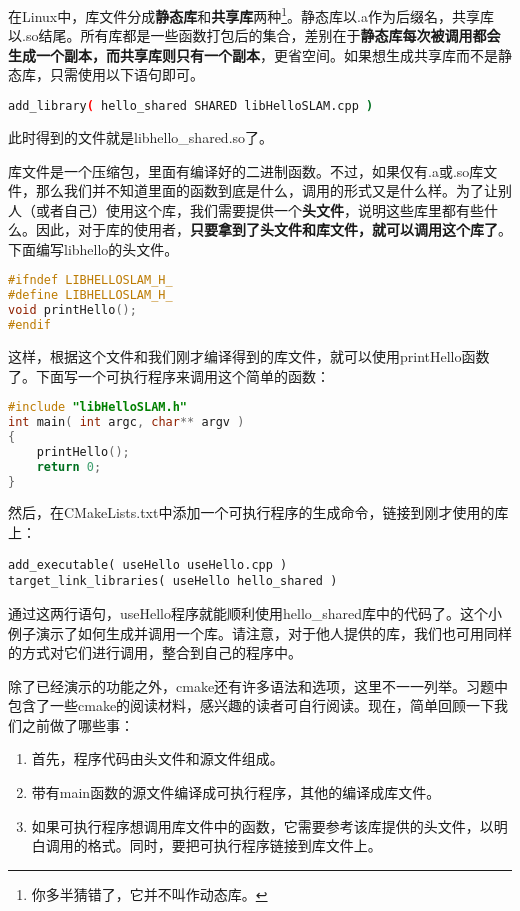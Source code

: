在Linux中，库文件分成\textbf{静态库}和\textbf{共享库}两种\footnote{你多半猜错了，它并不叫作动态库。}。静态库以.a作为后缀名，共享库以.so结尾。所有库都是一些函数打包后的集合，差别在于\textbf{静态库每次被调用都会生成一个副本，而共享库则只有一个副本}，更省空间。如果想生成共享库而不是静态库，只需使用以下语句即可。
\begin{lstlisting}[language=sh]
add_library( hello_shared SHARED libHelloSLAM.cpp )
\end{lstlisting}
此时得到的文件就是libhello\_shared.so了。

库文件是一个压缩包，里面有编译好的二进制函数。不过，如果仅有.a或.so库文件，那么我们并不知道里面的函数到底是什么，调用的形式又是什么样。为了让别人（或者自己）使用这个库，我们需要提供一个\textbf{头文件}，说明这些库里都有些什么。因此，对于库的使用者，\textbf{只要拿到了头文件和库文件，就可以调用这个库了}。下面编写libhello的头文件。

\begin{lstlisting}[language=c++,caption=slambook/ch2/libHelloSLAM.h]
#ifndef LIBHELLOSLAM_H_
#define LIBHELLOSLAM_H_
void printHello();
#endif
\end{lstlisting}

这样，根据这个文件和我们刚才编译得到的库文件，就可以使用printHello函数了。下面写一个可执行程序来调用这个简单的函数：

\begin{lstlisting}[language=c++,caption=slambook/ch2/useHello.cpp]
#include "libHelloSLAM.h"
int main( int argc, char** argv )
{
	printHello();
	return 0;
}
\end{lstlisting}

然后，在CMakeLists.txt中添加一个可执行程序的生成命令，链接到刚才使用的库上：
\begin{lstlisting}
add_executable( useHello useHello.cpp )
target_link_libraries( useHello hello_shared )
\end{lstlisting}

通过这两行语句，useHello程序就能顺利使用hello\_shared库中的代码了。这个小例子演示了如何生成并调用一个库。请注意，对于他人提供的库，我们也可用同样的方式对它们进行调用，整合到自己的程序中。

除了已经演示的功能之外，cmake还有许多语法和选项，这里不一一列举。习题中包含了一些cmake的阅读材料，感兴趣的读者可自行阅读。现在，简单回顾一下我们之前做了哪些事：

\begin{enumerate}
	\item 首先，程序代码由头文件和源文件组成。
	\item 带有main函数的源文件编译成可执行程序，其他的编译成库文件。
	\item 如果可执行程序想调用库文件中的函数，它需要参考该库提供的头文件，以明白调用的格式。同时，要把可执行程序链接到库文件上。
\end{enumerate}

